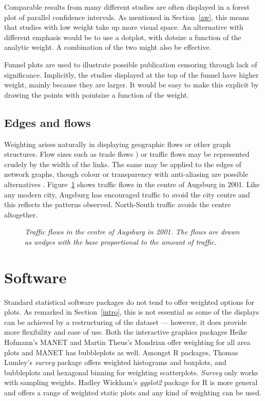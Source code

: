 \documentclass{svmult}
\begin{document}
Comparable results from many different studies are often displayed in a forest plot of parallel confidence intervals.  As mentioned in Section~\ref{aw}, this means that studies with low weight take up more visual space.  An alternative with different emphasis would be to use a dotplot, with dotsize a function of the analytic weight.  A combination of the two might also be effective.

Funnel plots are used to illustrate possible publication censoring through lack of significance.  Implicitly, the studies displayed at the top of the funnel have higher weight, mainly because they are larger.  It would be easy to make this explicit by drawing the points with pointsize a function of the weight.

\subsection{Edges and flows}
\label{edge}
Weighting arises naturally in displaying geographic flows or other graph structures.  Flow sizes such as trade flows \citep{unwin:1992}) or traffic flows may be represented crudely by the width of the links.  The same may be applied to the edges of network graphs, though colour or transparency with anti-aliasing are possible alternatives \citep{wills:2006}.  Figure~\ref{traffic} shows traffic flows in the centre of Augsburg in 2001.   Like any modern city, Augsburg has encouraged traffic to avoid the city centre and this reflects the patterns observed.  North-South traffic avoids the centre altogether.

\begin{figure}[htbp]
  \centering
  \caption{\label{traffic}\em Traffic flows in the centre of Augsburg in 2001. The flows are drawn as wedges with the base proportional to the amount of traffic. }
\end{figure}

\section{Software}
\label{sw}

Standard statistical software packages do not tend to offer weighted options for plots.  As remarked in Section~\ref{intro}, this is not essential as some of the displays can be achieved by a restructuring of the dataset --- however, it does provide more flexibility and ease of use.  Both the interactive graphics packages Heike Hofmann's MANET \citep{hofmann:2000a} and Martin Theus's Mondrian \citep{theus:2005} offer weighting for all area plots and MANET has bubbleplots as well.  Amongst R packages, Thomas Lumley's \textit{survey} \cite{survey} package offers weighted histograms and boxplots, and bubbleplots and hexagonal binning for weighting scatterplots.  \textit{Survey} only works with sampling weights.  Hadley Wickham's \textit{ggplot2} \cite{ggplot2} package for R is more general and offers a range of weighted static plots and any kind of weighting can be used.
\end{document}
